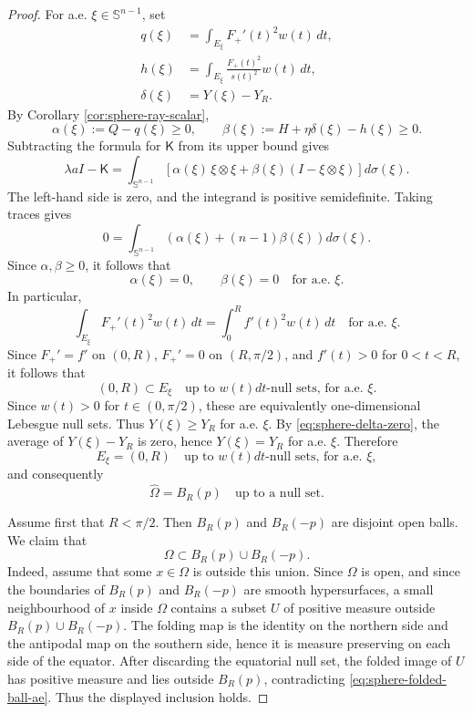 \documentclass[11pt]{amsart}
\theoremstyle{remark}
\newcommand{\Sn}{\mathbb S}
\newcommand{\Id}{I}
\newcommand{\mcK}{\mathsf K}
\begin{document}
\begin{proof}
For a.e. $\xi\in\Sn^{n-1}$, set
\begin{align*}
        q(\xi)&=\int_{E_\xi}F_+'(t)^2w(t)\,dt,\\
        h(\xi)&=\int_{E_\xi}\frac{F_+(t)^2}{s(t)^2}w(t)\,dt,\\
        \delta(\xi)&=Y(\xi)-Y_R.
\end{align*}
By Corollary \ref{cor:sphere-ray-scalar},
$$
        \alpha(\xi):=Q-q(\xi)\ge0,
        \qquad
        \beta(\xi):=H+\eta\delta(\xi)-h(\xi)\ge0.
$$
Subtracting the formula for $\mcK$ from its upper bound gives
$$
        \lambda a\Id-\mcK
        =\int_{\Sn^{n-1}}
        \left[\alpha(\xi)\,\xi\otimes\xi+\beta(\xi)(\Id-\xi\otimes\xi)\right]d\sigma(\xi).
$$
The left-hand side is zero, and the integrand is positive semidefinite.  Taking traces gives
$$
        0=\int_{\Sn^{n-1}}\left(\alpha(\xi)+(n-1)\beta(\xi)\right)d\sigma(\xi).
$$
Since $\alpha,\beta\ge0$, it follows that
$$
        \alpha(\xi)=0,
        \qquad
        \beta(\xi)=0
        \quad\text{for a.e. }\xi.
$$
In particular,
$$
        \int_{E_\xi}F_+'(t)^2w(t)\,dt
        =\int_0^R f'(t)^2w(t)\,dt
        \quad\text{for a.e. }\xi.
$$
Since $F_+'=f'$ on $(0,R)$, $F_+'=0$ on $(R,\pi/2)$, and $f'(t)>0$ for $0<t<R$, it follows that
$$
        (0,R)\subset E_\xi
        \quad\text{up to }w(t)dt\text{-null sets, for a.e. }\xi.
$$
Since $w(t)>0$ for $t\in(0,\pi/2)$, these are equivalently one-dimensional Lebesgue null sets.  Thus $Y(\xi)\ge Y_R$ for a.e. $\xi$.  By \eqref{eq:sphere-delta-zero}, the average of $Y(\xi)-Y_R$ is zero, hence $Y(\xi)=Y_R$ for a.e. $\xi$.  Therefore
$$
        E_\xi=(0,R)
        \quad\text{up to }w(t)dt\text{-null sets, for a.e. }\xi,
$$
and consequently
\begin{equation}\label{eq:sphere-folded-ball-ae}
        \widehat\Omega=B_R(p)
        \quad\text{up to a null set}.
\end{equation}

Assume first that $R<\pi/2$.  Then $B_R(p)$ and $B_R(-p)$ are disjoint open balls.  We claim that
$$
        \Omega\subset B_R(p)\cup B_R(-p).
$$
Indeed, assume that some $x\in\Omega$ is outside this union.  Since $\Omega$ is open, and since the boundaries of $B_R(p)$ and $B_R(-p)$ are smooth hypersurfaces, a small neighbourhood of $x$ inside $\Omega$ contains a subset $U$ of positive measure outside $B_R(p)\cup B_R(-p)$.  The folding map is the identity on the northern side and the antipodal map on the southern side, hence it is measure preserving on each side of the equator.  After discarding the equatorial null set, the folded image of $U$ has positive measure and lies outside $B_R(p)$, contradicting \eqref{eq:sphere-folded-ball-ae}.  Thus the displayed inclusion holds.


\end{proof}
\end{document}
